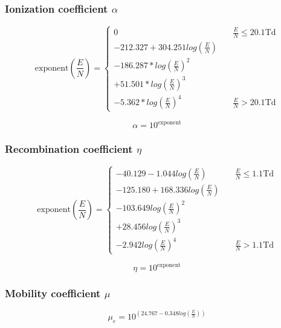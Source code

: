 \documentclass[12pt, a4paper]{report}
\begin{document}
\subsubsection*{Ionization coefficient $\alpha$}

\begin{equation*}
    \mathrm{exponent}\left( \frac{E}{N} \right) = \left\{
            \begin{array}{ll}
                0 & \quad \frac{E}{N} \leq 20.1\mathrm{Td} \\ \hline
                -212.327 + 304.251 log \left( \frac{E}{N} \right) \\ -186.287*log \left( \frac{E}{N} \right)^2 \\+ 51.501*log \left( \frac{E}{N} \right)^3 \\-5.362*log \left( \frac{E}{N} \right)^4 & \quad \frac{E}{N} > 20.1\mathrm{Td}
            \end{array}
        \right.
    \end{equation*}

\begin{equation*}
    \alpha = 10^{\mathrm{exponent}}
\end{equation*}

\subsubsection*{Recombination coefficient $\eta$}

\begin{equation*}
    \mathrm{exponent} \left( \frac{E}{N} \right) = \left\{
            \begin{array}{ll}
                -40.129 -1.044log \left( \frac{E}{N} \right) & \quad \frac{E}{N} \leq 1.1 \mathrm{Td}\\\hline
                -125.180 + 168.336log \left( \frac{E}{N} \right)\\ -103.649log \left( \frac{E}{N} \right)^2\\ + 28.456log \left( \frac{E}{N} \right)^3\\ -2.942log \left( \frac{E}{N} \right)^4 & \quad \frac{E}{N} > 1.1\mathrm{Td}
            \end{array}
        \right.
    \end{equation*}

\begin{equation*}
    \eta = 10^{\mathrm{exponent}}
\end{equation*}

\subsubsection*{Mobility coefficient $\mu$}
\begin{equation*}
    \mu_e = 10^{\left(24.767 -0.348log \left( \frac{E}{N} \right)\right) }
\end{equation*}
\end{document}
